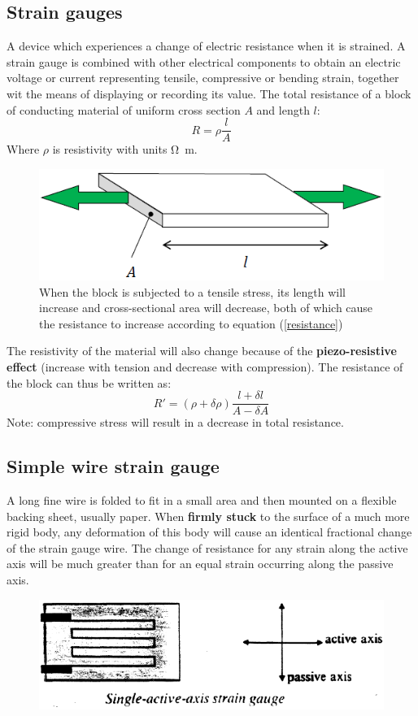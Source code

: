 \documentclass[class=report, crop=false, 12pt,a4paper, tikz, border=4mm]{standalone}
\begin{document}
\subsection{Strain gauges}
A device which experiences a change of electric resistance when it is strained. A strain gauge is combined with other electrical components to obtain an electric voltage or current representing tensile, compressive or bending strain, together wit the means of displaying or recording its value. The total resistance of a block of conducting material of uniform cross section $A$ and length $l$:
\begin{equation}
  R = \rho \frac{l}{A}
  \label{resistance}
\end{equation}
Where $\rho$ is resistivity with units \si{\ohm \meter}.
\begin{figure}[H]
  \centering
  \includegraphics[width = 0.8 \textwidth]{../img/diagram9.png}
  \caption{When the block is subjected to a tensile stress, its length will increase and cross-sectional area will decrease, both of which cause the resistance to increase according to equation (\ref{resistance})}
\end{figure}
The resistivity of the material will also change because of the \textbf{piezo-resistive effect} (increase with tension and decrease with compression). The resistance of the block can thus be written as:
\begin{equation}
  R' = (\rho + \delta \rho) \frac{l + \delta l}{A - \delta A}
\end{equation}
Note: compressive stress will result in a decrease in total resistance.
\subsection{Simple wire strain gauge}
A long fine wire is folded to fit in a small area and then mounted on a flexible backing sheet, usually paper. When \textbf{firmly stuck} to the surface of a much more rigid body, any deformation of this body will cause an identical fractional change of the strain gauge wire. The change of resistance for any strain along the active axis will be much greater than for an equal strain occurring along the passive axis.
\begin{figure}[H]
  \centering
  \includegraphics[width = 0.8 \textwidth]{../img/diagram10.png}
\end{figure}
\end{document}
